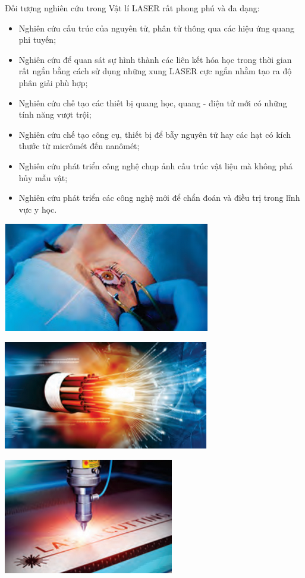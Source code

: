 \begin{minipage}[l]{0.6\textwidth}
Đối tượng nghiên cứu trong Vật lí LASER rất phong phú và đa dạng:
\begin{itemize}
	\item Nghiên cứu cấu trúc của nguyên tử, phân tử thông qua các hiệu ứng quang phi tuyến;
	\item Nghiên cứu để quan sát sự hình thành các liên kết hóa học trong thời gian rất ngắn bằng cách sử dụng những xung LASER cực ngắn nhằm tạo ra độ phân giải phù hợp;
	\item Nghiên cứu chế tạo các thiết bị quang học, quang - điện tử mới có những tính năng vượt trội;
	\item Nghiên cứu chế tạo công cụ, thiết bị để bẫy nguyên tử hay các hạt có kích thước từ micrômét đến nanômét;
	\item Nghiên cứu phát triển công nghệ chụp ảnh cấu trúc vật liệu mà không phá hủy mẫu vật;
	\item Nghiên cứu phát triển các công nghệ mới để chẩn đoán và điều trị trong lĩnh vực y học.
\end{itemize}
\end{minipage}
\begin{minipage}[r]{0.4\textwidth}
\begin{center}
	\includegraphics[scale=0.6]{../figs/G10-002-7}
\end{center}
\begin{center}
	\includegraphics[scale=0.6]{../figs/G10-002-8}
\end{center}
\begin{center}
	\includegraphics[scale=0.7]{../figs/G10-002-9}
\end{center}
\end{minipage}
